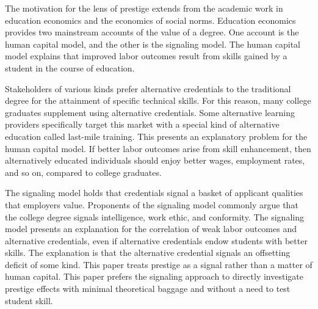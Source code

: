 The motivation for the lens of prestige extends from the academic work in education economics and the economics of social norms.
Education economics provides two mainstream accounts of the value of a degree.
One account is the human capital model, and the other is the signaling model.
The human capital model explains that improved labor outcomes result from skills gained by a student in the course of education.

Stakeholders of various kinds prefer alternative credentials to the traditional degree for the attainment of specific technical skills\cite{craig2018new}.
For this reason, many college graduates supplement using alternative credentials.
Some alternative learning providers specifically target this market with a special kind of alternative education called last-mile training.
This presents an explanatory problem for the human capital model.
If better labor outcomes arise from skill enhancement,
then alternatively educated individuals should enjoy better wages, employment rates, and so on,
compared to college graduates.

The signaling model holds that credentials signal a basket of applicant qualities that employers value.
Proponents of the signaling model commonly argue that the college degree signals intelligence,
work ethic, and conformity\cite{caplan_2012}.
The signaling model presents an explanation for
the correlation of weak labor outcomes and alternative credentials,
even if alternative credentials endow students with better skills.
The explanation is that the alternative credential signals
an offsetting deficit of some kind.
This paper treats prestige as a signal rather than a matter of human capital.
This paper prefers the signaling approach to directly investigate prestige effects
with minimal theoretical baggage and without a need to test student skill.

